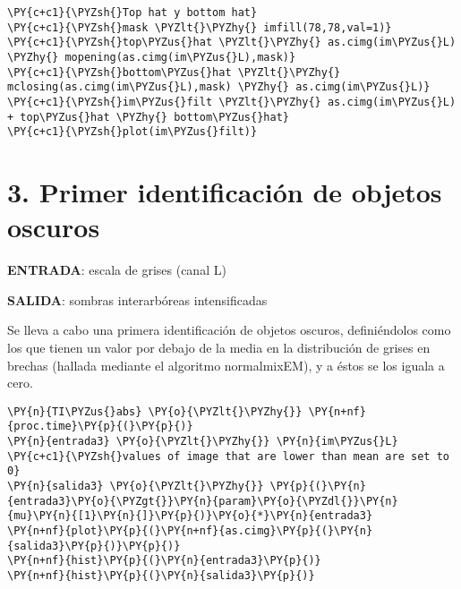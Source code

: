     \begin{tcolorbox}[breakable, size=fbox, boxrule=1pt, pad at break*=1mm,colback=cellbackground, colframe=cellborder]
\begin{Verbatim}[commandchars=\\\{\}]
\PY{c+c1}{\PYZsh{}Top hat y bottom hat}
\PY{c+c1}{\PYZsh{}mask \PYZlt{}\PYZhy{} imfill(78,78,val=1)}
\PY{c+c1}{\PYZsh{}top\PYZus{}hat \PYZlt{}\PYZhy{} as.cimg(im\PYZus{}L) \PYZhy{} mopening(as.cimg(im\PYZus{}L),mask)}
\PY{c+c1}{\PYZsh{}bottom\PYZus{}hat \PYZlt{}\PYZhy{}  mclosing(as.cimg(im\PYZus{}L),mask) \PYZhy{} as.cimg(im\PYZus{}L)}
\PY{c+c1}{\PYZsh{}im\PYZus{}filt \PYZlt{}\PYZhy{} as.cimg(im\PYZus{}L) + top\PYZus{}hat \PYZhy{} bottom\PYZus{}hat}
\PY{c+c1}{\PYZsh{}plot(im\PYZus{}filt)}
\end{Verbatim}
\end{tcolorbox}

    \hypertarget{primer-identificaciuxf3n-de-objetos-oscuros}{%
\section{3. Primer identificación de objetos
oscuros}\label{primer-identificaciuxf3n-de-objetos-oscuros}}

\textbf{ENTRADA}: escala de grises (canal L)

\textbf{SALIDA}: sombras interarbóreas intensificadas

Se lleva a cabo una primera identificación de objetos oscuros,
definiéndolos como los que tienen un valor por debajo de la media en la
distribución de grises en brechas (hallada mediante el algoritmo
normalmixEM), y a éstos se los iguala a cero.

    \begin{tcolorbox}[breakable, size=fbox, boxrule=1pt, pad at break*=1mm,colback=cellbackground, colframe=cellborder]
\begin{Verbatim}[commandchars=\\\{\}]
\PY{n}{TI\PYZus{}abs} \PY{o}{\PYZlt{}\PYZhy{}} \PY{n+nf}{proc.time}\PY{p}{(}\PY{p}{)}
\PY{n}{entrada3} \PY{o}{\PYZlt{}\PYZhy{}} \PY{n}{im\PYZus{}L}
\PY{c+c1}{\PYZsh{}values of image that are lower than mean are set to 0}
\PY{n}{salida3} \PY{o}{\PYZlt{}\PYZhy{}} \PY{p}{(}\PY{n}{entrada3}\PY{o}{\PYZgt{}}\PY{n}{param}\PY{o}{\PYZdl{}}\PY{n}{mu}\PY{n}{[1}\PY{n}{]}\PY{p}{)}\PY{o}{*}\PY{n}{entrada3}
\PY{n+nf}{plot}\PY{p}{(}\PY{n+nf}{as.cimg}\PY{p}{(}\PY{n}{salida3}\PY{p}{)}\PY{p}{)}
\PY{n+nf}{hist}\PY{p}{(}\PY{n}{entrada3}\PY{p}{)}
\PY{n+nf}{hist}\PY{p}{(}\PY{n}{salida3}\PY{p}{)}
\end{Verbatim}
\end{tcolorbox}

